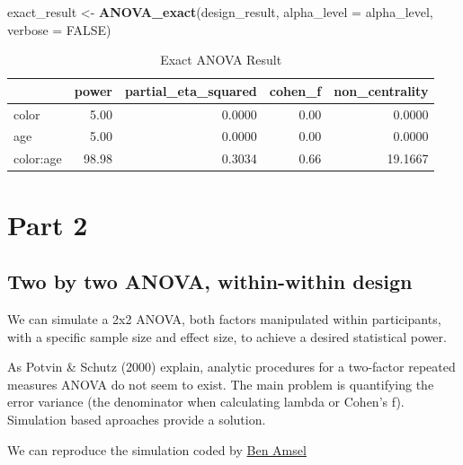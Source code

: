 \documentclass[]{book}
\newenvironment{Shaded}{\begin{snugshade}}{\end{snugshade}}
\newcommand{\DataTypeTok}[1]{\textcolor[rgb]{0.13,0.29,0.53}{#1}}
\newcommand{\KeywordTok}[1]{\textcolor[rgb]{0.13,0.29,0.53}{\textbf{#1}}}
\newcommand{\NormalTok}[1]{#1}
\newcommand{\OtherTok}[1]{\textcolor[rgb]{0.56,0.35,0.01}{#1}}
\newcommand{\StringTok}[1]{\textcolor[rgb]{0.31,0.60,0.02}{#1}}
\begin{document}
\begin{Shaded}
\begin{Highlighting}[]
\NormalTok{exact_result <-}\StringTok{ }\KeywordTok{ANOVA_exact}\NormalTok{(design_result,}
                            \DataTypeTok{alpha_level =}\NormalTok{ alpha_level,}
                            \DataTypeTok{verbose =} \OtherTok{FALSE}\NormalTok{)}
\end{Highlighting}
\end{Shaded}

\begin{table}[t]

\caption{\label{tab:unnamed-chunk-141}Exact ANOVA Result}
\centering
\begin{tabular}{l|r|r|r|r}
\hline
  & power & partial\_eta\_squared & cohen\_f & non\_centrality\\
\hline
color & 5.00 & 0.0000 & 0.00 & 0.0000\\
\hline
age & 5.00 & 0.0000 & 0.00 & 0.0000\\
\hline
color:age & 98.98 & 0.3034 & 0.66 & 19.1667\\
\hline
\end{tabular}
\end{table}

\hypertarget{part-2-1}{%
\section{Part 2}\label{part-2-1}}

\hypertarget{two-by-two-anova-within-within-design}{%
\subsection{Two by two ANOVA, within-within design}\label{two-by-two-anova-within-within-design}}

We can simulate a 2x2 ANOVA, both factors manipulated within participants, with a specific sample size and effect size, to achieve a desired statistical power.

As Potvin \& Schutz (2000) explain, analytic procedures for a two-factor repeated measures ANOVA do not seem to exist. The main problem is quantifying the error variance (the denominator when calculating lambda or Cohen's f). Simulation based aproaches provide a solution.

We can reproduce the simulation coded by \href{https://cognitivedatascientist.com/2015/12/14/power-simulation-in-r-the-repeated-measures-anova-5/}{Ben Amsel}
\end{document}
